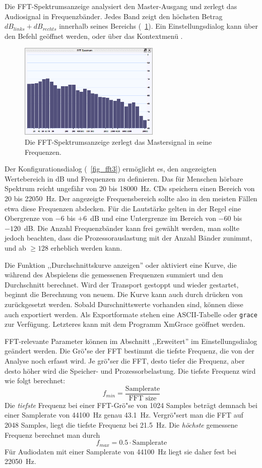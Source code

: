 Die FFT-Spektrumsanzeige analysiert den Master-Ausgang und zerlegt das Audiosignal in Frequenzbänder. Jedes Band zeigt den höchsten Betrag $dB_{links} + dB_{rechts}$ innerhalb seines Bereichs (\FigB\ \ref{fig_fft1}). Ein Einstellungsdialog kann über den Befehl  geöffnet werden, oder über das Kontextmenü .

\begin{figure}
	\centering
	\includegraphics[width=0.6\textwidth]{../images/fft1}
	\caption{Die FFT-Spektrumsanzeige zerlegt das Mastersignal in seine Frequenzen.}
	\label{fig_fft1}
\end{figure}

Der Konfigurationsdialog (\FigB\ \ref{fig_fft3}) ermöglicht es, den angezeigten Wertebereich in dB und Frequenzen zu definieren. Das für Menschen hörbare Spektrum reicht ungefähr von 20 bis 18000~Hz. CDs speichern einen Bereich von 20 bis 22050~Hz. Der angezeigte Frequensbereich sollte also in den meisten Fällen etwa diese Frequenzen abdecken. Für die Lautstärke gelten in der Regel eine Obergrenze von $-6$ bis $+6$~dB und eine Untergrenze im Bereich von $-60$ bis $-120$~dB. Die Anzahl Frequenzbänder kann frei gewählt werden, man sollte jedoch beachten, dass die Prozessorauslastung mit der Anzahl Bänder zunimmt, und ab $\geq 128$ erheblich werden kann.

Die Funktion ,,Durchschnittskurve anzeigen'' oder  aktiviert eine Kurve, die während des Abspielens die gemessenen Frequenzen summiert und den Durchschnitt berechnet. Wird der Transport gestoppt und wieder gestartet, beginnt die Berechnung von neuem. Die Kurve kann auch durch drücken von  zurückgesetzt werden. Sobald Durschnittswerte vorhanden sind, können diese auch exportiert werden. Als Exportformate stehen eine ASCII-Tabelle oder \texttt{grace} zur Verfügung. Letzteres kann mit dem Programm XmGrace geöffnet werden.

FFT-relevante Parameter können im Abschnitt ,,Erweitert'' im Einstellungsdialog geändert werden. Die Grö"se der FFT bestimmt die tiefste Frequenz, die von der Analyse noch erfasst wird. Je grö"ser die FFT, desto tiefer die Frequenz, aber desto höher wird die Speicher- und Prozessorbelastung. Die tiefste Frequenz wird wie folgt berechnet:
\[
f_{min} = \frac{\textrm{Samplerate}}{\textrm{FFT size}}
\]
Die \emph{tiefste} Frequenz bei einer FFT-Grö"se von 1024 Samples beträgt demnach bei einer Samplerate von 44100~Hz genau 43.1~Hz. Vergrö"sert man die FFT auf 2048 Samples, liegt die tiefste Frequenz bei 21.5~Hz. Die \emph{höchste} gemessene Frequenz berechnet man durch
\[
f_{max} = 0.5 \cdot \textrm{Samplerate}
\]
Für Audiodaten mit einer Samplerate von 44100~Hz liegt sie daher fest bei 22050~Hz.

